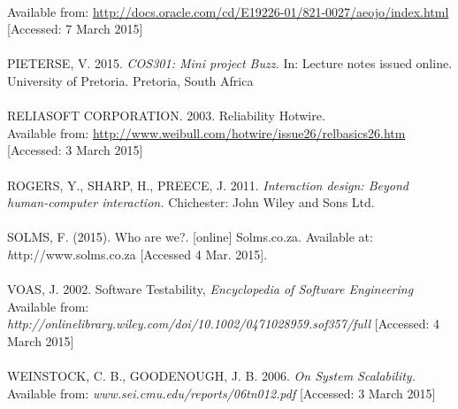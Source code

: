 \documentclass[a4paper]{article}
\begin{document}
\\Available from:  \url{http://docs.oracle.com/cd/E19226-01/821-0027/aeojo/index.html}
[Accessed: 7 March 2015]
\\
\\PIETERSE, V. 2015.\textit{ COS301: Mini project Buzz.} In: Lecture notes issued online. University of Pretoria. Pretoria, South Africa
\\
\\RELIASOFT CORPORATION. 2003. Reliability Hotwire.
\\Available from: \url{http://www.weibull.com/hotwire/issue26/relbasics26.htm}
[Accessed: 3 March 2015]
\\
\\ROGERS, Y., SHARP, H., PREECE, J. 2011.\textit{ Interaction design: Beyond human-computer interaction.} Chichester: John Wiley and Sons Ltd.
\\
\\SOLMS, F. (2015). Who are we?. [online] Solms.co.za. Available at: \textit http://www.solms.co.za [Accessed 4 Mar. 2015].
\\
\\VOAS, J. 2002. Software Testability,\textit{ Encyclopedia of Software Engineering}
Available from:\textit{ http://onlinelibrary.wiley.com/doi/10.1002/0471028959.sof357/full}
[Accessed: 4 March 2015]
\\
\\WEINSTOCK, C. B., GOODENOUGH, J. B. 2006. \textit{On System Scalability. }
Available from: \textit{www.sei.cmu.edu/reports/06tn012.pdf}
[Accessed: 3 March 2015]
\\
\end{document}
